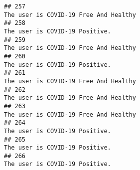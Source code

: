 \documentclass[
]{article}
\begin{document}
\begin{verbatim}
## 257                                                                                                                                                                                                                              The user is COVID-19 Free And Healthy
## 258                                                                                                                                                                                                                                     The user is COVID-19 Positive.
## 259                                                                                                                                                                                                                              The user is COVID-19 Free And Healthy
## 260                                                                                                                                                                                                                                     The user is COVID-19 Positive.
## 261                                                                                                                                                                                                                              The user is COVID-19 Free And Healthy
## 262                                                                                                                                                                                                                              The user is COVID-19 Free And Healthy
## 263                                                                                                                                                                                                                              The user is COVID-19 Free And Healthy
## 264                                                                                                                                                                                                                                     The user is COVID-19 Positive.
## 265                                                                                                                                                                                                                                     The user is COVID-19 Positive.
## 266                                                                                                                                                                                                                                     The user is COVID-19 Positive.

\end{verbatim}
\end{document}
